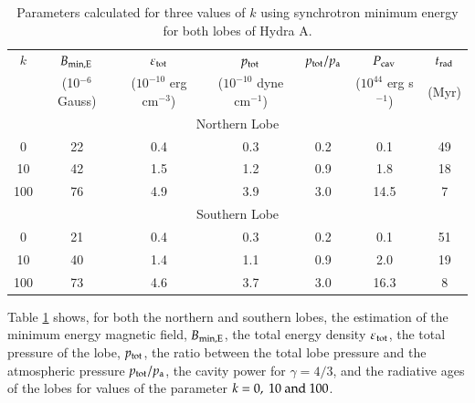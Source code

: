 \begin{table}
\caption{Parameters calculated for three values of $k$ using synchrotron minimum energy for both lobes of Hydra A. }
\label{minimum_energy}
\centering
\begin{threeparttable}
\begin{tabular}{*{7}{c}}
\hline \hline
   $k$ & $B_{\rm{min,E}}$  & $\varepsilon_{\rm{tot}}$  & $p_{\rm{tot}}$ &  $p_{\rm{tot}}/p_{\rm{a}}$ & $P_{\rm{cav}}$ & $t_{\rm{rad}}$    \\
       & (10$^{-6}$ Gauss)  & ($10^{-10}$ erg cm$^{-3}$) &  ($10^{-10}$ dyne cm${^{-1}}$) & & ($10^{44}$ erg s$^{-1}$) & (Myr)  \\ 
             \multicolumn{7}{c}{Northern Lobe} \\ \hline
  0 & 22 & 0.4 & 0.3  & 0.2 & 0.1 & 49  \\ 
  10 & 42 & 1.5 & 1.2 & 0.9 &  1.8 &  18 \\ 
  100 & 76 & 4.9 &  3.9 & 3.0 & 14.5  & 7  \\
  \hline
   \multicolumn{7}{c}{Southern Lobe} \\ \hline
       0 &  21 & 0.4 & 0.3 & 0.2 &  0.1  & 51 \\
       10 & 40 & 1.4 & 1.1 &  0.9 &  2.0 & 19 \\ 
       100 & 73 & 4.6 & 3.7 & 3.0 &  16.3   & 8 \\
\hline
\end{tabular}
\end{threeparttable}
\end{table}


Table \ref{minimum_energy} shows, for both the northern and southern lobes, the estimation of the minimum energy magnetic field, $B_{\rm{min,E}}$, the total energy density $\varepsilon_{\rm tot}$, the total pressure of the lobe, $p_{\rm{tot}}$, the ratio between the total lobe pressure and the atmospheric pressure $p_{\rm{tot}}/p_{\rm{a}}$, the cavity power for $\gamma = 4/3$, and the radiative ages of the lobes for values of the parameter $k=0, \ 10 \rm \ and \ 100$.

